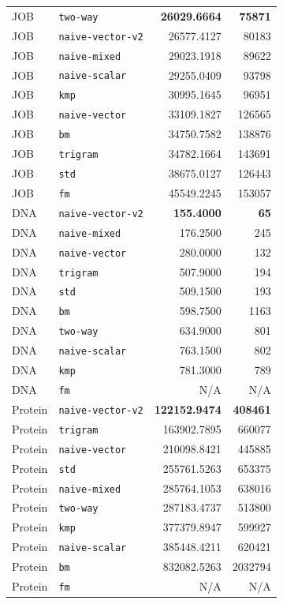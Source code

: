 \documentclass[11pt]{article}
\begin{document}
\begin{longtable}{@{}llrr@{}}
JOB & \texttt{two-way}         & \textbf{26029.6664} & \textbf{75871} \\
JOB & \texttt{naive-vector-v2} & 26577.4127          & 80183 \\
JOB & \texttt{naive-mixed}     & 29023.1918          & 89622 \\
JOB & \texttt{naive-scalar}    & 29255.0409          & 93798 \\
JOB & \texttt{kmp}             & 30995.1645          & 96951 \\
JOB & \texttt{naive-vector}    & 33109.1827          & 126565 \\
JOB & \texttt{bm}              & 34750.7582          & 138876 \\
JOB & \texttt{trigram}         & 34782.1664          & 143691 \\
JOB & \texttt{std}             & 38675.0127          & 126443 \\
JOB & \texttt{fm}              & 45549.2245          & 153057 \\
\addlinespace

DNA & \texttt{naive-vector-v2} & \textbf{155.4000} & \textbf{65} \\
DNA & \texttt{naive-mixed}     & 176.2500          & 245 \\
DNA & \texttt{naive-vector}    & 280.0000          & 132 \\
DNA & \texttt{trigram}         & 507.9000          & 194 \\
DNA & \texttt{std}             & 509.1500          & 193 \\
DNA & \texttt{bm}              & 598.7500          & 1163 \\
DNA & \texttt{two-way}         & 634.9000          & 801 \\
DNA & \texttt{naive-scalar}    & 763.1500          & 802 \\
DNA & \texttt{kmp}             & 781.3000          & 789 \\
DNA & \texttt{fm}              & N/A               & N/A \\
\addlinespace

Protein & \texttt{naive-vector-v2} & \textbf{122152.9474} & \textbf{408461} \\
Protein & \texttt{trigram}         & 163902.7895          & 660077 \\
Protein & \texttt{naive-vector}    & 210098.8421          & 445885 \\
Protein & \texttt{std}             & 255761.5263          & 653375 \\
Protein & \texttt{naive-mixed}     & 285764.1053          & 638016 \\
Protein & \texttt{two-way}         & 287183.4737          & 513800 \\
Protein & \texttt{kmp}             & 377379.8947          & 599927 \\
Protein & \texttt{naive-scalar}    & 385448.4211          & 620421 \\
Protein & \texttt{bm}              & 832082.5263          & 2032794 \\
Protein & \texttt{fm}              & N/A                  & N/A \\
\end{longtable}
\end{document}
